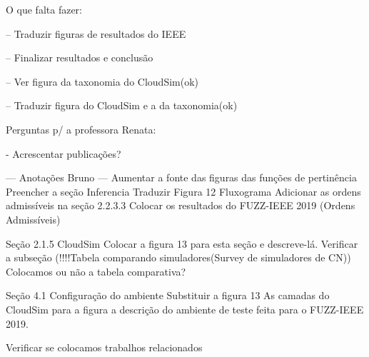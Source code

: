 O que falta fazer:

-- Traduzir figuras de resultados do IEEE

-- Finalizar resultados e conclusão


-- Ver figura da taxonomia do CloudSim(ok)

-- Traduzir figura do CloudSim e a da taxonomia(ok)

Perguntas p/ a professora Renata:

- Acrescentar publicações?


--- Anotações Bruno ---
Aumentar a fonte das figuras das funções de pertinência
Preencher a seção Inferencia
Traduzir Figura 12 Fluxograma
Adicionar as ordens admissíveis na seção 2.2.3.3
Colocar os resultados do FUZZ-IEEE 2019 (Ordens Admissíveis)

Seção 2.1.5 CloudSim
Colocar a figura 13 para esta seção e descreve-lá.
Verificar a subseção (!!!!Tabela comparando simuladores(Survey de simuladores de CN))
Colocamos ou não a tabela comparativa?

Seção 4.1 Configuração do ambiente
Substituir a figura 13 As camadas do CloudSim para a figura a descrição do ambiente de teste feita para o FUZZ-IEEE 2019.

Verificar se colocamos trabalhos relacionados


